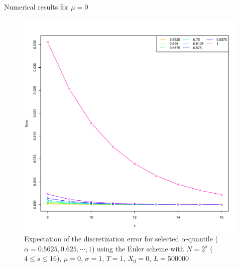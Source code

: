 \documentclass[cjk,10pt]{beamer}
\begin{document}
\begin{frame}{Numerical results for $\mu=0$}
\begin{figure}
   \centering
   \includegraphics[scale=0.3]{nout_0.pdf} %
   \caption{Expectation of the discretization error for selected $\alpha$-quantile ($\alpha = 0.5625, 0.625, \cdots, 1$) using the Euler scheme with $N = 2^s$ ($4\le s \le 16$), $\mu=0$, $\sigma=1$, $T=1$, $X_0=0$, $L=500000$ }
   \label{f:err}
\end{figure}
\end{frame}
\end{document}
